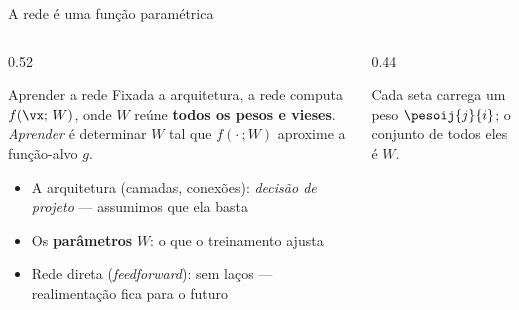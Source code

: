 \documentclass[aspectratio=169, 11pt]{beamer}
\begin{document}
\begin{frame}{A rede é uma função paramétrica}
  \begin{columns}[T]
    \begin{column}{0.52\textwidth}
      \begin{defbox}{Aprender a rede}
        Fixada a arquitetura, a rede computa $f(\vx;\, W)$, onde $W$ reúne
        \textbf{todos os pesos e vieses}. \emph{Aprender} é determinar $W$
        tal que $f(\cdot\,; W)$ aproxime a função-alvo $g$.
      \end{defbox}
      \begin{itemize}\setlength{\itemsep}{0.3ex}
        \item A arquitetura (camadas, conexões): \emph{decisão de projeto} —
              assumimos que ela basta
        \item Os \textbf{parâmetros} $W$: o que o treinamento ajusta
        \item Rede direta (\emph{feedforward}): sem laços — realimentação
              fica para o futuro
      \end{itemize}
    \end{column}
    \begin{column}{0.44\textwidth}
      \begin{center}
      \end{center}
      \begin{center}
        {\small\color{icCinza} Cada seta carrega um peso $\pesoij{j}{i}$;
        o conjunto de todos eles é $W$.}
      \end{center}
    \end{column}
  \end{columns}
\end{frame}
\end{document}
